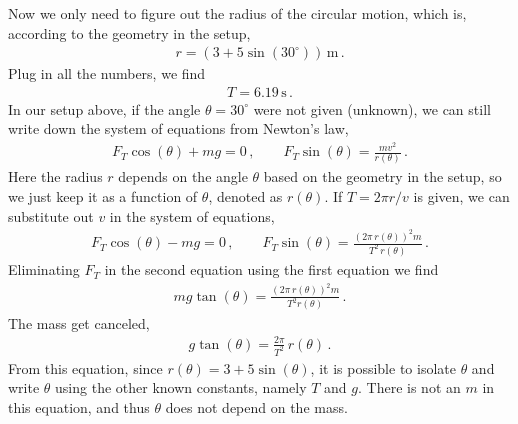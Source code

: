 \documentclass[11pt]{article}
\begin{document}
Now we only need to figure out the radius of the circular motion, which is, according to the geometry in the setup, 
\begin{align*}
r =(3+5\sin(30^\circ))\,\text{m}\,.
\end{align*}
Plug in all the numbers, we find
\begin{align*}
T = 6.19 \, \text{s}\,.
\end{align*}
In our setup above, if the angle $\theta=30^\circ$ were not given (unknown), we can still write down the system of equations from Newton's law,
\begin{align*}
F_T\cos(\theta)+mg = 0\,,\qquad
F_T \sin(\theta) = \frac{mv^2}{r(\theta)}\,.
\end{align*}
Here the radius $r$ depends on the angle $\theta$ based on the geometry in the setup, so we just keep it as a function of $\theta$, denoted as $r(\theta)$. If $T = 2\pi r/v$ is given, we can substitute out $v$ in the system of equations,
\begin{align*}
F_T\cos(\theta) -mg = 0\,,\qquad
F_T\sin(\theta) = \frac{(2\pi\, r(\theta))^2m}{T^2\,r(\theta)}\,.
\end{align*}
Eliminating $F_T$ in the second equation using the first equation we find
\begin{align*}
mg \tan(\theta)= \frac{(2\pi\, r(\theta))^2 m}{T^2 r(\theta)}\,.
\end{align*}
The mass get canceled, 
\begin{align*}
g\tan(\theta) = \frac{2\pi }{T^2}\, r(\theta)\,.
\end{align*}
From this equation, since $r(\theta) = 3+5\sin(\theta)$, it is possible to isolate $\theta$ and write $\theta$ using the other known constants, namely $T$ and $g$. There is not an $m$ in this equation, and thus $\theta$ does not depend on the mass. 
\end{document}
